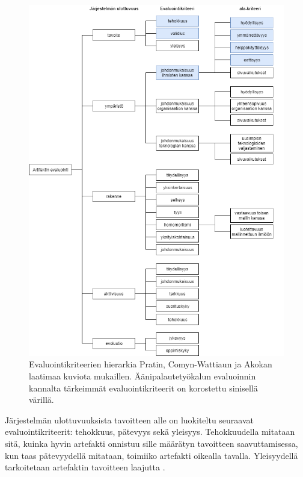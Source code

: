 \documentclass[utf8]{gradu3}
\begin{document}
\begin{figure}[h]\centering
  \includegraphics[width=\textwidth,height=\textheight,keepaspectratio]{evaluointikriteerit}
  \caption[]{Evaluointikriteerien hierarkia Pratin, Comyn-Wattiaun ja Akokan \parencite[][]{evaluation} laatimaa kuviota mukaillen. Äänipalautetyökalun evaluoinnin kannalta tärkeimmät evaluointikriteerit on korostettu sinisellä värillä.}
  \label{fig:evaluointikriteerit}
\end{figure}

Järjestelmän ulottuvuuksista tavoitteen alle on luokiteltu seuraavat evaluointikriteerit:  tehokkuus, pätevyys sekä yleisyys. Tehokkuudella mitataan sitä, kuinka hyvin artefakti onnistuu sille määrätyn tavoitteen saavuttamisessa, kun taas pätevyydellä mitataan, toimiiko artefakti oikealla tavalla. Yleisyydellä tarkoitetaan artefaktin tavoitteen laajutta \parencite[][]{evaluation}.
\end{document}
